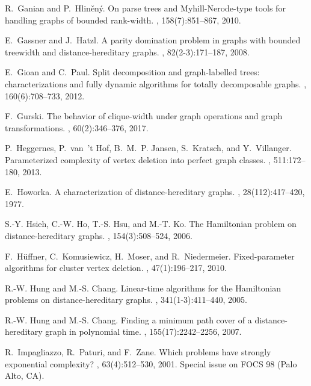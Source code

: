 \documentclass[11pt]{elsarticle}
\begin{document}
\begin{thebibliography}{10}
R.~Ganian and P.~Hlin{\v{e}}n{\'y}.
\newblock On parse trees and {M}yhill-{N}erode-type tools for handling graphs
  of bounded rank-width.
, 158(7):851--867, 2010.

E.~Gassner and J.~Hatzl.
\newblock A parity domination problem in graphs with bounded treewidth and
  distance-hereditary graphs.
, 82(2-3):171--187, 2008.

E.~Gioan and C.~Paul.
\newblock Split decomposition and graph-labelled trees: characterizations and
  fully dynamic algorithms for totally decomposable graphs.
, 160(6):708--733, 2012.

F.~Gurski.
\newblock The behavior of clique-width under graph operations and graph
  transformations.
, 60(2):346--376, 2017.

P.~Heggernes, P.~van~'t Hof, B.~M.~P. Jansen, S.~Kratsch, and Y.~Villanger.
\newblock Parameterized complexity of vertex deletion into perfect graph
  classes.
, 511:172--180, 2013.

E.~Howorka.
\newblock A characterization of distance-hereditary graphs.
, 28(112):417--420, 1977.

S.-Y. Hsieh, C.-W. Ho, T.-S. Hsu, and M.-T. Ko.
\newblock The {H}amiltonian problem on distance-hereditary graphs.
, 154(3):508--524, 2006.

F.~H{\"u}ffner, C.~Komusiewicz, H.~Moser, and R.~Niedermeier.
\newblock Fixed-parameter algorithms for cluster vertex deletion.
, 47(1):196--217, 2010.

R.-W. Hung and M.-S. Chang.
\newblock Linear-time algorithms for the {H}amiltonian problems on
  distance-hereditary graphs.
, 341(1-3):411--440, 2005.

R.-W. Hung and M.-S. Chang.
\newblock Finding a minimum path cover of a distance-hereditary graph in
  polynomial time.
, 155(17):2242--2256, 2007.

R.~Impagliazzo, R.~Paturi, and F.~Zane.
\newblock Which problems have strongly exponential complexity?
, 63(4):512--530, 2001.
\newblock Special issue on FOCS 98 (Palo Alto, CA).


\end{thebibliography}
\end{document}
